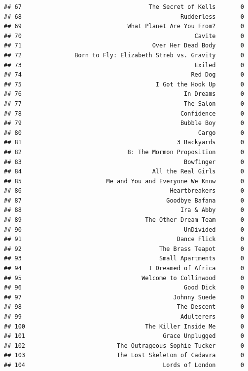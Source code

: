 \documentclass[
]{article}
\begin{document}
\begin{verbatim}
## 67                                    The Secret of Kells       0
## 68                                             Rudderless       0
## 69                              What Planet Are You From?       0
## 70                                                 Cavite       0
## 71                                     Over Her Dead Body       0
## 72               Born to Fly: Elizabeth Streb vs. Gravity       0
## 73                                                 Exiled       0
## 74                                                Red Dog       0
## 75                                      I Got the Hook Up       0
## 76                                              In Dreams       0
## 77                                              The Salon       0
## 78                                             Confidence       0
## 79                                             Bubble Boy       0
## 80                                                  Cargo       0
## 81                                            3 Backyards       0
## 82                              8: The Mormon Proposition       0
## 83                                              Bowfinger       0
## 84                                     All the Real Girls       0
## 85                        Me and You and Everyone We Know       0
## 86                                          Heartbreakers       0
## 87                                         Goodbye Bafana       0
## 88                                             Ira & Abby       0
## 89                                   The Other Dream Team       0
## 90                                              UnDivided       0
## 91                                            Dance Flick       0
## 92                                       The Brass Teapot       0
## 93                                       Small Apartments       0
## 94                                    I Dreamed of Africa       0
## 95                                  Welcome to Collinwood       0
## 96                                              Good Dick       0
## 97                                           Johnny Suede       0
## 98                                            The Descent       0
## 99                                             Adulterers       0
## 100                                  The Killer Inside Me       0
## 101                                       Grace Unplugged       0
## 102                          The Outrageous Sophie Tucker       0
## 103                          The Lost Skeleton of Cadavra       0
## 104                                       Lords of London       0

\end{verbatim}
\end{document}
